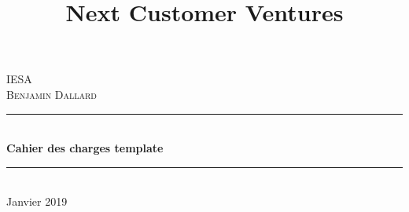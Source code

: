 \documentclass[12pt]{article}
\begin{document}
\begin{titlepage}

\newcommand{\HRule}{\rule{\linewidth}{0.5mm}} %

\center %
 
\title{Next Customer Ventures}

\textsc{\LARGE IESA}\\[1.8cm] %
\textsc{\Large Benjamin Dallard}\\[0.5cm] %



\HRule \\[0.4cm]
{ \huge \bfseries Cahier des charges template}\\[0.4cm] %
\HRule \\[1.5cm]
 





{Janvier 2019}\\[2cm] %



\end{titlepage}
\end{document}
